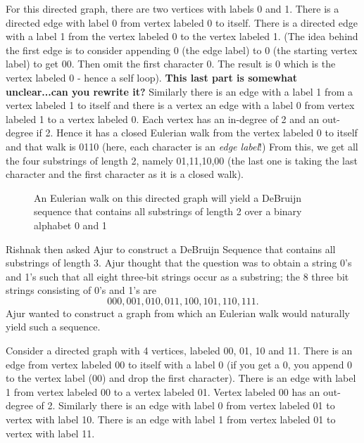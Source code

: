 For this directed graph, there are two vertices with labels 0 and 1. There is a directed edge with label 0 from vertex labeled 0 to itself. There is a directed edge with a label 1 from the vertex labeled 0 to the vertex labeled 1. (The idea behind the first edge is to consider appending 0 (the edge label) to 0 (the starting vertex label) to get 00. Then omit the first character 0. The result is 0 which is the vertex labeled 0 - hence a self loop). \textbf{This last part is somewhat unclear...can you rewrite it?} Similarly there is an edge with a label 1 from a vertex labeled 1 to itself and there is a vertex an edge with 
a label 0 from vertex labeled 1 to a vertex labeled 0.
Each vertex has an in-degree of 2 and an out-degree if 2. Hence it has a closed Eulerian walk from the vertex labeled 0 to itself and that walk is 0110 (here, each character is an \emph{edge label}!) From this, we get all the four substrings of length 2, namely 01,11,10,00 (the last one is taking the last character and the first character as it is a closed walk).

\begin{figure}
\begin{center}
\caption{ An Eulerian walk on this directed graph will yield a DeBruijn sequence that contains  all substrings of length 2 over a binary alphabet 0 and 1}\label{4g55}
\end{center}
\end{figure}
Rishnak then asked Ajur to construct a DeBruijn Sequence that contains all substrings of length 3.
Ajur thought that the question was to obtain a string 0's and 1's such that all eight three-bit strings occur as a substring; the 8 three bit strings consisting of 0's and 1's are 
$$000, 001, 010, 011, 100, 101, 110, 111.$$ Ajur wanted to construct a graph from which an Eulerian walk would naturally yield such a sequence. 

Consider a directed graph with 4 vertices, labeled 00, 01, 10 and 11.
There is an edge from vertex labeled 00 to itself with a label 0 (if you get a 0, you append 0 to the vertex label (00) and drop the first character). There is an edge with label 1 from
vertex labeled 00 to a vertex labeled 01. Vertex labeled 00 has an out-degree of 2. Similarly there is an edge with label 0 from vertex labeled 01 to vertex with label 10. There is an edge with label 1 from vertex labeled 01 to vertex with label 11. 


